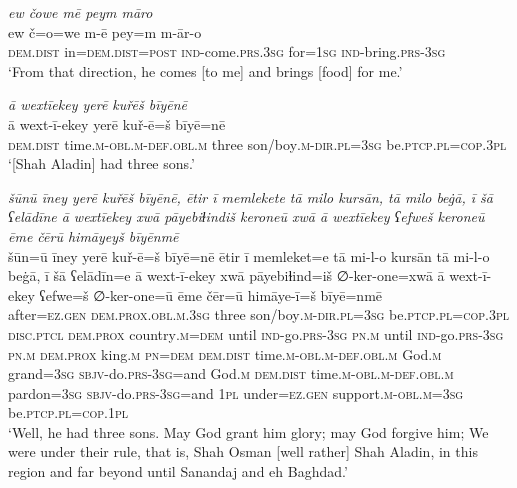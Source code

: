 \ea \label{PM.48}
\textit{ew čowe mē peym māro} \\ 
\gll ew č=o=we m-ē pey=m m-ār-o \\ 
 \textsc{dem.dist} in=\textsc{dem.dist}\textsc{=\textsc{post}} \textsc{ind-}come\textsc{.prs}\textsc{.3sg} for\textsc{=\textsc{1sg}} \textsc{ind-}bring\textsc{.prs}\textsc{-3sg} \\ 
\glt `From that direction, he  comes [to me] and brings [food] for me.'
\z 
 
\ea \label{DG.3}
\textit{ā wextīekey yerē kuřēš bīyēnē} \\ 
\gll ā wext-ī-ekey yerē kuř-ē=š bīyē=nē \\ 
 \textsc{dem.dist} time\textsc{.m}\textsc{-obl}\textsc{.m}\textsc{-def}\textsc{.obl}\textsc{.m} three son/boy\textsc{.m}\textsc{-dir}\textsc{.pl}\textsc{=3sg} be\textsc{.ptcp}\textsc{.pl}\textsc{=cop}\textsc{.3pl} \\ 
\glt `[Shah Aladin] had three sons.'
\z 
 
\ea \label{DG.4}
\textit{šūnū īney yerē kuřēš bīyēnē, ētir ī memlekete tā milo kursān, tā milo beġā, ī šā ʕelādīne ā wextīekey xwā pāyebiɫindiš keroneū xwā ā wextīekey ʕefweš keroneū ēme čērū himāyeyš bīyēnmē} \\ 
\gll šūn=ū īney yerē kuř-ē=š bīyē=nē ētir ī memleket=e tā mi-l-o kursān tā mi-l-o beġā, ī šā ʕelādīn=e ā wext-ī-ekey xwā pāyebiɫind=iš ∅-ker-one=xwā ā wext-ī-ekey ʕefwe=š ∅-ker-one=ū ēme čēr=ū himāye-ī=š bīyē=nmē \\ 
 after\textsc{=ez}\textsc{.gen} \textsc{dem.prox}\textsc{.obl}\textsc{.m}\textsc{.3sg} three son/boy\textsc{.m}\textsc{-dir}\textsc{.pl}\textsc{=3sg} be\textsc{.ptcp}\textsc{.pl}\textsc{=cop}\textsc{.3pl} \textsc{disc.ptcl} \textsc{dem.prox} country\textsc{.m}\textsc{=dem} until \textsc{ind-}go\textsc{.prs}\textsc{-3sg} \textsc{pn}\textsc{.m} until \textsc{ind-}go\textsc{.prs}\textsc{-3sg} \textsc{pn}\textsc{.m} \textsc{dem.prox} king\textsc{.m} \textsc{pn}\textsc{=dem} \textsc{dem.dist} time\textsc{.m}\textsc{-obl}\textsc{.m}\textsc{-def}\textsc{.obl}\textsc{.m} God\textsc{.m} grand\textsc{=3sg} \textsc{sbjv-}do\textsc{.prs}\textsc{-3sg}=and God\textsc{.m} \textsc{dem.dist} time\textsc{.m}\textsc{-obl}\textsc{.m}\textsc{-def}\textsc{.obl}\textsc{.m} pardon\textsc{=3sg} \textsc{sbjv-}do\textsc{.prs}\textsc{-3sg}=and \textsc{1pl} under\textsc{=ez}\textsc{.gen} support\textsc{.m}\textsc{-obl}\textsc{.m}\textsc{=3sg} be\textsc{.ptcp}\textsc{.pl}\textsc{=cop}\textsc{.1pl} \\ 
\glt `Well, he had three sons. May God grant him glory; may God forgive him; We were under their rule, that is, Shah Osman [well rather] Shah Aladin, in this region and far beyond until Sanandaj and eh Baghdad.'
\z 
 
